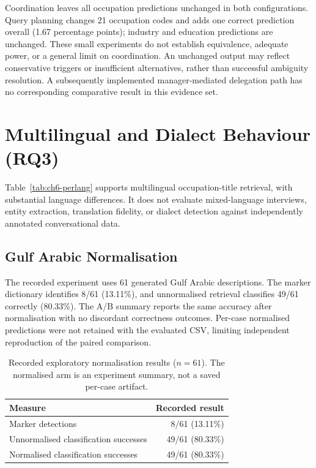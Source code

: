 Coordination leaves all occupation predictions unchanged in both
configurations. Query planning changes 21 occupation codes and adds one
correct prediction overall (1.67 percentage points); industry and education
predictions are unchanged. These small
experiments do not establish equivalence, adequate power, or a general
limit on coordination. An unchanged output may reflect conservative
triggers or insufficient alternatives, rather than successful ambiguity
resolution. A subsequently implemented manager-mediated delegation path
has no corresponding comparative result in this evidence set.

\section{Multilingual and Dialect Behaviour (RQ3)}
\label{sec:res-multilingual}

Table~\ref{tab:ch6-perlang} supports multilingual occupation-title retrieval,
with substantial language differences. It does not evaluate mixed-language
interviews, entity extraction, translation fidelity, or dialect detection
against independently annotated conversational data.

\subsection{Gulf Arabic Normalisation}

The recorded experiment uses 61 generated Gulf Arabic descriptions.
The marker dictionary identifies 8/61 (13.11\%), and unnormalised retrieval
classifies 49/61 correctly (80.33\%). The A/B summary reports the same
accuracy after normalisation with no discordant correctness outcomes.
Per-case normalised predictions were not retained with the evaluated CSV,
limiting independent reproduction of the paired comparison.

\begin{table}[htbp]
\centering
\caption{Recorded exploratory normalisation results ($n=61$). The
normalised arm is an experiment summary, not a saved per-case artifact.}
\label{tab:ch6-gulf}
\small\renewcommand{\arraystretch}{1.3}
\begin{tabular}{lr}
\toprule
\textbf{Measure} & \textbf{Recorded result} \\
\midrule
Marker detections & 8/61 (13.11\%) \\
Unnormalised classification successes & 49/61 (80.33\%) \\
Normalised classification successes & 49/61 (80.33\%) \\
\bottomrule
\end{tabular}
\end{table}

